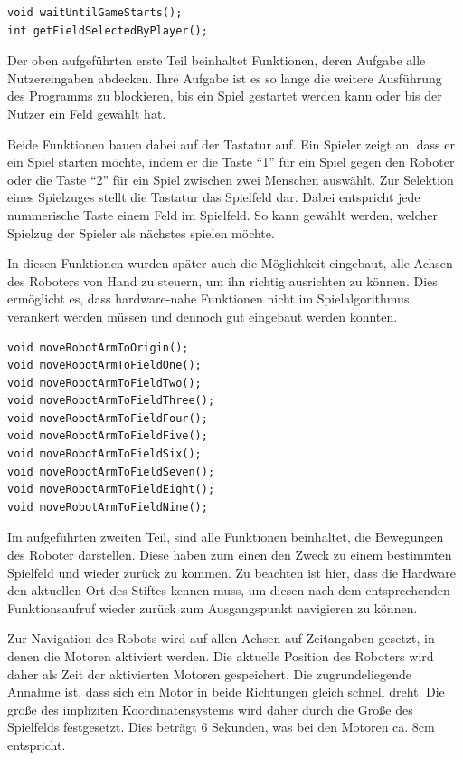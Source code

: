 \documentclass[conference,compsoc,final,a4paper]{IEEEtran}
\begin{document}
\begin{verbatim}
void waitUntilGameStarts();
int getFieldSelectedByPlayer();
\end{verbatim}

Der oben aufgeführten erste Teil beinhaltet Funktionen, deren Aufgabe alle Nutzereingaben abdecken.
Ihre Aufgabe ist es so lange die weitere Ausführung des Programms zu blockieren,
bis ein Spiel gestartet werden kann oder bis der Nutzer ein Feld gewählt hat.

Beide Funktionen bauen dabei auf der Tastatur auf. Ein Spieler zeigt an, dass er ein Spiel starten
möchte, indem er die Taste \enquote{1} für ein Spiel gegen den Roboter oder die Taste \enquote{2}
für ein Spiel zwischen zwei Menschen auswählt. Zur Selektion eines Spielzuges stellt die Tastatur
das Spielfeld dar. Dabei entspricht jede nummerische Taste einem Feld im Spielfeld. So kann
gewählt werden, welcher Spielzug der Spieler als nächstes spielen möchte.

In diesen Funktionen wurden später auch die Möglichkeit eingebaut, alle Achsen des Roboters von 
Hand zu steuern, um ihn richtig ausrichten zu können. Dies ermöglicht es, dass hardware-nahe Funktionen
nicht im Spielalgorithmus verankert werden müssen und dennoch gut eingebaut werden konnten.

\begin{verbatim}
void moveRobotArmToOrigin();
void moveRobotArmToFieldOne();
void moveRobotArmToFieldTwo();
void moveRobotArmToFieldThree();
void moveRobotArmToFieldFour();
void moveRobotArmToFieldFive();
void moveRobotArmToFieldSix();
void moveRobotArmToFieldSeven();
void moveRobotArmToFieldEight();
void moveRobotArmToFieldNine();
\end{verbatim}

Im aufgeführten zweiten Teil, sind alle Funktionen beinhaltet, die Bewegungen des Roboter darstellen. Diese haben
zum einen den Zweck zu einem bestimmten Spielfeld und wieder zurück zu kommen. Zu beachten ist hier,
dass die Hardware den aktuellen Ort des Stiftes kennen muss, um diesen nach dem entsprechenden Funktionsaufruf
wieder zurück zum Ausgangspunkt navigieren zu können.

Zur Navigation des Robots wird auf allen Achsen auf Zeitangaben gesetzt, in denen die Motoren aktiviert werden. Die
aktuelle Position des Roboters wird daher als Zeit der aktivierten Motoren gespeichert. Die zugrundeliegende Annahme
ist, dass sich ein Motor in beide Richtungen gleich schnell dreht. Die größe des impliziten Koordinatensystems wird
daher durch die Größe des Spielfelds festgesetzt. Dies beträgt 6 Sekunden, was bei den Motoren ca. 8cm entspricht.
\end{document}
